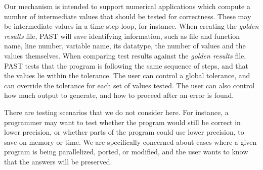 Our mechanism is intended to support numerical applications which compute a number of intermediate values that should be tested for correctness.
These may be intermediate values in a time-step loop, for instance.
When creating the \emph{golden results} file, PAST will save identifying information, such as file and function name, line number, variable name, its datatype, the number of values and the values themselves.
When comparing test results against the \emph{golden results} file, PAST tests that the program is following the same sequence of steps, and that the values lie within the tolerance.
The user can control a global tolerance, and can override the tolerance for each set of values tested.
The user can also control how much output to generate, and how to proceed after an error is found.

There are testing scenarios that we do not consider here.
For instance, a programmer may want to test whether the program would still be correct in lower precision, or whether parts of the program could use lower precision, to save on memory or time.
We are specifically concerned about cases where a given program is being parallelized, ported, or modified, and the user wants to know that the answers will be preserved.

